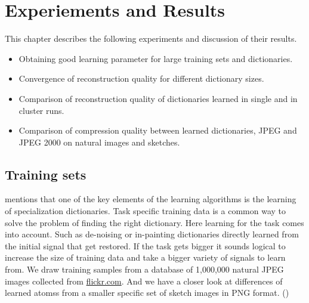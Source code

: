 \chapter{Experiements and Results}

This chapter describes the following experiments and discussion of their
results.
\begin{itemize}
 \item Obtaining good learning parameter for large training sets and
dictionaries.
 \item Convergence of reconstruction quality for different dictionary sizes.
 \item Comparison of reconstruction quality of dictionaries
learned in single and in cluster runs. 
 \item Comparison of compression quality between learned dictionaries, JPEG
and JPEG 2000 on natural images and sketches.
\end{itemize}

\section{Training sets}
 mentions that one of the key
elements of the learning algorithms is the learning of specialization
dictionaries. Task specific training data is a common way to solve the problem
of finding the right dictionary. Here learning for the task comes into
account. Such as de-noising or in-painting dictionaries directly learned from
the initial signal that get restored. If the task gets bigger it sounds logical
to increase the size of training data and take a bigger variety of signals to
learn from.  We draw training samples from a database of 1,000,000 natural JPEG
images collected from \url{flickr.com}. And we have a closer look at differences
of learned atomss from a smaller specific set of sketch images in PNG format.
()

